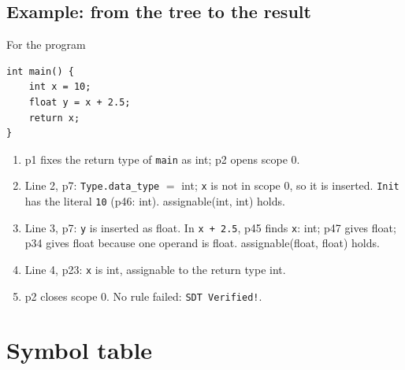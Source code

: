 \documentclass[11pt,letterpaper]{article}
\let\oldsection\section
\renewcommand{\section}{\needspace{8\baselineskip}\oldsection}
\let\oldsubsection\subsection
\renewcommand{\subsection}{\needspace{6\baselineskip}\oldsubsection}
\newcommand{\ok}[1]{\textcolor{okgreen}{\texttt{#1}}}
\begin{document}
\subsection{Example: from the tree to the result}\label{sec:semex}

For the program

\noindent\begin{minipage}{\linewidth}
\begin{lstlisting}[style=ccode]
int main() {
    int x = 10;
    float y = x + 2.5;
    return x;
}
\end{lstlisting}
\end{minipage}

\begin{enumerate}
  \item p1 fixes the return type of \texttt{main} as int; p2 opens scope 0.
  \item Line 2, p7: \texttt{Type.data\_type} $=$ int; \texttt{x} is not in
        scope 0, so it is inserted. \texttt{Init} has the literal \texttt{10}
        (p46: int). assignable(int, int) holds.
  \item Line 3, p7: \texttt{y} is inserted as float. In \texttt{x + 2.5},
        p45 finds \texttt{x}: int; p47 gives float; p34 gives float because
        one operand is float. assignable(float, float) holds.
  \item Line 4, p23: \texttt{x} is int, assignable to the return type int.
  \item p2 closes scope 0. No rule failed: \ok{SDT Verified!}.
\end{enumerate}

\section{Symbol table}
\end{document}
